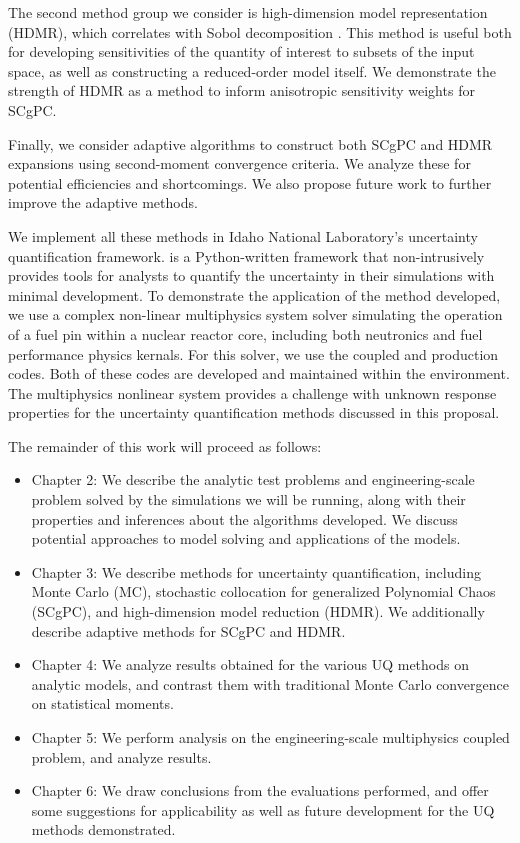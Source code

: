 The second method group we consider is high-dimension model representation (HDMR), which correlates with Sobol
decomposition \cite{hdmr}.  This method is useful both for developing sensitivities of the quantity of interest to subsets
of the input space, as well as constructing a reduced-order model itself.  We demonstrate the strength of HDMR
as a method to inform anisotropic sensitivity weights for SCgPC.

Finally, we consider adaptive algorithms to construct both SCgPC and HDMR expansions using second-moment
convergence criteria.  We analyze these for potential efficiencies and shortcomings.  We also propose future
work to further improve the adaptive methods.

We implement all these methods in Idaho National Laboratory's \raven{}\cite{raven}
uncertainty quantification framework. \raven{} is a Python-written framework that non-intrusively provides
tools for analysts to quantify the uncertainty in their simulations with minimal development.  To demonstrate
the application of the method developed, we use a complex non-linear multiphysics system solver simulating
the operation of a fuel pin within a nuclear reactor core, including both neutronics and fuel performance
physics kernals.  For this solver, we use the coupled \rattlesnake{}\cite{rattlesnake} and 
\bison{} \cite{bison,mammoth} production codes.
Both of these codes are developed and maintained within the \moose{}\cite{moose} environment.  The
multiphysics nonlinear system provides a challenge with unknown response properties for the uncertainty
quantification methods discussed in this proposal.

The remainder of this work will proceed as follows:
\begin{itemize}
  \item Chapter 2: We describe the analytic test problems and engineering-scale problem solved by the simulations 
    we will be running, along with their properties and inferences about the algorithms developed.
    We discuss potential approaches to model solving and applications of the models.
  \item Chapter 3: We describe methods for uncertainty quantification, including Monte Carlo (MC),
    stochastic collocation for generalized Polynomial Chaos (SCgPC), and high-dimension model reduction
    (HDMR).  We additionally describe adaptive methods for SCgPC and HDMR.
  \item Chapter 4: We analyze results obtained for the various UQ methods on analytic models, and contrast 
    them with traditional Monte Carlo convergence on statistical moments.
  \item Chapter 5: We perform analysis on the engineering-scale multiphysics coupled problem, and analyze
    results.
  \item Chapter 6: We draw conclusions from the evaluations performed, and offer some suggestions for
    applicability as well as future development for the UQ methods demonstrated.
\end{itemize}
